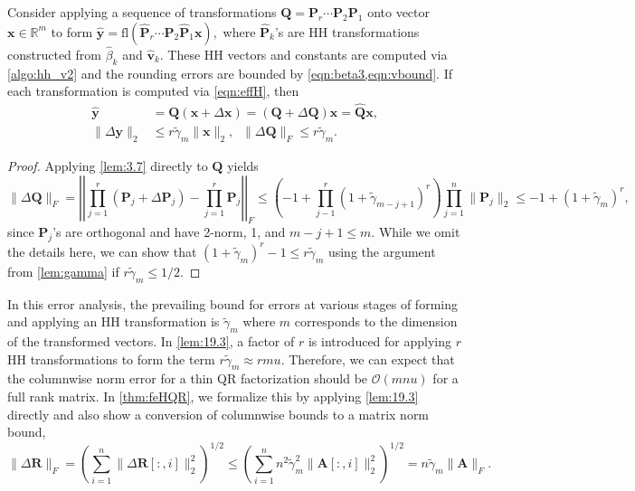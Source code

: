 \documentclass[review,onefignum,onetabnum]{siamart190516}
\newcommand{\R}{\mathbb{R}}
\newcommand{\bb}[1]{\mathbf{#1}}
\newcommand{\fl}{\mathrm{fl}}
\newcommand{\cO}{\mathcal{O}}
\begin{document}
\begin{lemma}\label{lem:19.3}
	Consider applying a sequence of transformations $\bb{Q}=\bb{P}_{r}\cdots\bb{P}_{2}\bb{P}_1$ onto vector $\bb{x}\in\R^m$ to form $\hat{\bb{y}} =\fl(\hat{\bb{P}}_{r}\cdots\hat{\bb{P}}_{2}\hat{\bb{P}}_{1}\bb{x}),$
	where $\hat{\bb{P}}_{k}$'s are HH transformations constructed from $\hat{\beta}_k$ and $\hat{\bb{v}}_{k}$.
	These HH vectors and constants are computed via \cref{algo:hh_v2} and the rounding errors are bounded by \cref{eqn:beta3,eqn:vbound}.
	If each transformation is computed via \cref{eqn:effH}, then
	\begin{align}
	\hat{\bb{y}} &= \bb{Q} (\bb{x} +\Delta \bb{x}) = (\bb{Q} + \Delta \bb{Q})\bb{x} = \hat{\bb{Q}}\bb{x},\\
	\|\Delta \bb{y}\|_2 &\leq r\tilde{\gamma}_m\|\bb{x}\|_2,\;\; \|\Delta \bb{Q}\|_F\leq r\tilde{\gamma}_m .\label{eqn:19.3}
	\end{align}
\end{lemma}
\begin{proof}
	Applying \cref{lem:3.7} directly to $\bb{Q}$ yields
	\[
		\|\Delta\bb{Q}\|_F = \left|\left|\prod_{j=1}^r (\bb{P}_{j} + \Delta \bb{P}_{j})- \prod_{j=1}^r\bb{P}_{j} \right|\right|_F\leq\left(-1+\prod_{j-1}^r(1+\tilde{\gamma}_{m-j+1})^r\right)\prod_{j=1}^n\|\bb{P}_{j}\|_2 \leq -1+(1+\tilde{\gamma}_m)^r,\]
	since $\bb{P}_{j}$'s are orthogonal and have 2-norm, 1, and $m-j+1 \leq m$.
	While we omit the details here, we can show that $(1+\tilde{\gamma}_m)^r-1 \leq r\tilde{\gamma}_m$ using the argument from \cref{lem:gamma} if $r\tilde{\gamma}_m \leq 1/2$.
\end{proof}
In this error analysis, the prevailing bound for errors at various stages of forming and applying an HH transformation is $\tilde{\gamma}_{m}$ where $m$ corresponds to the dimension of the transformed vectors.
In \cref{lem:19.3}, a factor of $r$ is introduced for applying $r$ HH transformations to form the term $r\tilde{\gamma}_m \approx rmu$. 
Therefore, we can expect that the columnwise norm error for a thin QR factorization should be $\cO(mnu)$ for a full rank matrix.
In \cref{thm:feHQR}, we formalize this by applying \cref{lem:19.3} directly and also show a conversion of columnwise bounds to a matrix norm bound,
\begin{equation*}
	\|\Delta \bb{R} \|_F = \left(\sum_{i=1}^n \|\Delta \bb{R}[:,i]\|_2^2\right)^{1/2} \leq \left(\sum_{i=1}^n n^2\tilde{\gamma}_{m}^2 \|\bb{A}[:,i]\|_2^2\right)^{1/2} = n\tilde{\gamma}_{m} \|\bb{A}\|_F.
\end{equation*}
\end{document}
